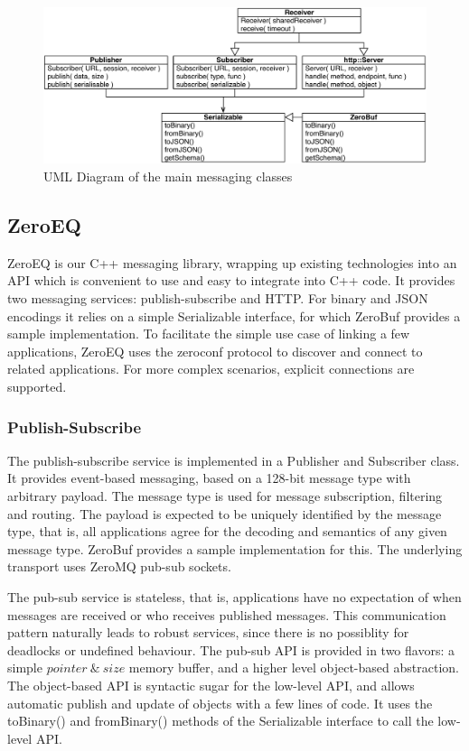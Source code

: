 \documentclass[10pt]{llncs}
\begin{document}
\begin{figure}[ht]\center
  \includegraphics[width=\columnwidth]{images/ZeroMSUML}
  \caption{\label{fUML}UML Diagram of the main messaging classes}
\end{figure}

\subsection{ZeroEQ}

ZeroEQ is our C++ messaging library, wrapping up existing technologies into an
API which is convenient to use and easy to integrate into C++ code. It provides
two messaging services: publish-subscribe and HTTP. For binary and JSON
encodings it relies on a simple \textsf{Serializable} interface, for which
ZeroBuf provides a sample implementation. To facilitate the simple use case of
linking a few applications, ZeroEQ uses the zeroconf protocol to discover and
connect to related applications. For more complex scenarios, explicit
connections are supported.

\subsubsection{Publish-Subscribe}

The publish-subscribe service is implemented in a \textsf{Publisher} and
\textsf{Subscriber} class. It provides event-based messaging, based on a 128-bit
message type with arbitrary payload. The message type is used for message
subscription, filtering and routing. The payload is expected to be uniquely
identified by the message type, that is, all applications agree for the decoding
and semantics of any given message type. ZeroBuf provides a sample
implementation for this. The underlying transport uses ZeroMQ pub-sub sockets.

The pub-sub service is stateless, that is, applications have no expectation of
when messages are received or who receives published messages. This
communication pattern naturally leads to robust services, since there is no
possiblity for deadlocks or undefined behaviour. The pub-sub API is provided in
two flavors: a simple $pointer\ \&\ size$ memory buffer, and a higher level
object-based abstraction. The object-based API is syntactic sugar for the
low-level API, and allows automatic publish and update of objects with a few
lines of code. It uses the \textsf{toBinary()} and \textsf{fromBinary()} methods
of the \textsf{Serializable} interface to call the low-level API.
\end{document}
